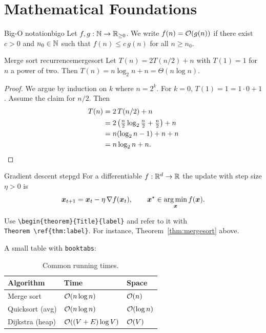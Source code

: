 \section{Mathematical Foundations}\label{sec:math}

\begin{definition}{Big-O notation}{bigo}
Let $f,g:\mathbb{N}\to\mathbb{R}_{\ge 0}$. We write $f(n)=\O(g(n))$ if there exist $c>0$ and
$n_0\in\mathbb{N}$ such that $f(n)\le c\,g(n)$ for all $n\ge n_0$.
\end{definition}

\begin{theorem}{Merge sort recurrence}{mergesort}
Let $T(n)=2T(n/2)+n$ with $T(1)=1$ for $n$ a power of two. Then
$T(n)=n\log_2 n + n=\Theta(n\log n)$.
\end{theorem}

\begin{proof}
We argue by induction on $k$ where $n=2^k$. For $k=0$, $T(1)=1=1\cdot 0+1$.
Assume the claim for $n/2$. Then
\begin{align}
T(n) &= 2\,T(n/2) + n \notag\\
     &= 2\left(\tfrac{n}{2}\log_2\tfrac{n}{2} + \tfrac{n}{2}\right) + n \notag\\
     &= n(\log_2 n - 1) + n + n \notag\\
     &= n\log_2 n + n. \qedhere
\end{align}
\end{proof}

\begin{example}{Gradient descent step}{gd}
For a differentiable $f:\mathbb{R}^d\to\mathbb{R}$ the update with step size $\eta>0$ is
\[
  \bm{x}_{t+1} = \bm{x}_t - \eta\,\nabla f(\bm{x}_t),
  \qquad
  \bm{x}^\star \in \operatorname*{arg\,min}_{\bm{x}} f(\bm{x}).
\]
\end{example}

\begin{notebox}[Note]
Use \texttt{\textbackslash begin\{theorem\}\{Title\}\{label\}} and refer to it
with \texttt{Theorem~\textbackslash ref\{thm:label\}}. For instance,
Theorem~\ref{thm:mergesort} above.
\end{notebox}

A small table with \texttt{booktabs}:
\begin{table}[h]
\centering
\caption{Common running times.}
\begin{tabular}{@{}lll@{}}
\toprule
\textbf{Algorithm} & \textbf{Time} & \textbf{Space} \\
\midrule
Merge sort      & $\O(n\log n)$     & $\O(n)$ \\
Quicksort (avg) & $\O(n\log n)$     & $\O(\log n)$ \\
Dijkstra (heap) & $\O((V+E)\log V)$ & $\O(V)$ \\
\bottomrule
\end{tabular}
\end{table}
